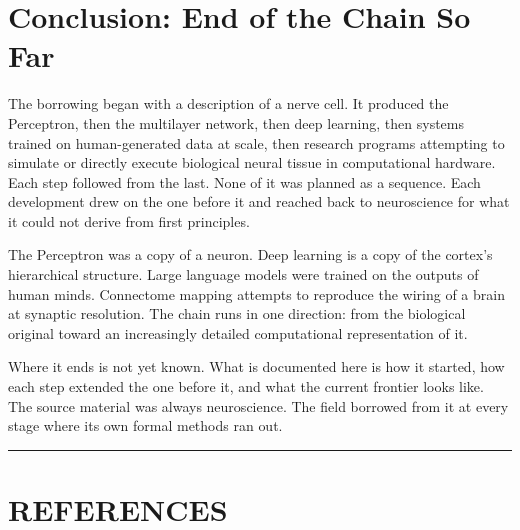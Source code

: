 \documentclass[11pt,a4paper]{article}
\begin{document}
\section{Conclusion: End of the Chain So Far}

The borrowing began with a description of a nerve cell. It produced the Perceptron, then the multilayer network, then deep learning, then systems trained on human-generated data at scale, then research programs attempting to simulate or directly execute biological neural tissue in computational hardware. Each step followed from the last. None of it was planned as a sequence. Each development drew on the one before it and reached back to neuroscience for what it could not derive from first principles.

The Perceptron was a copy of a neuron. Deep learning is a copy of the cortex's hierarchical structure. Large language models were trained on the outputs of human minds. Connectome mapping attempts to reproduce the wiring of a brain at synaptic resolution. The chain runs in one direction: from the biological original toward an increasingly detailed computational representation of it.

Where it ends is not yet known. What is documented here is how it started, how each step extended the one before it, and what the current frontier looks like. The source material was always neuroscience. The field borrowed from it at every stage where its own formal methods ran out.

\vspace{0.4em}
\noindent\rule{\textwidth}{0.4pt}

\section*{REFERENCES}
\end{document}
